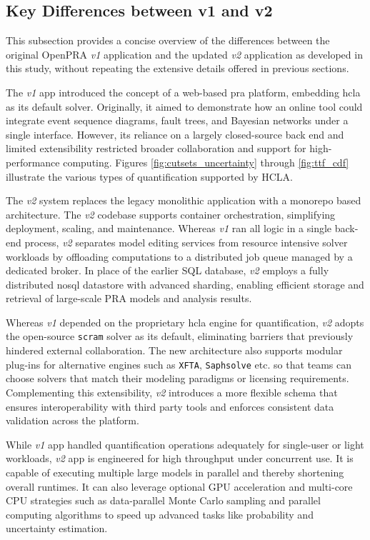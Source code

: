 \subsection{Key Differences between v1 and v2}
\label{sec:distinguish-v1-v2}
This subsection provides a concise overview of the differences between the original OpenPRA \textit{v1} application and the updated \textit{v2} application as developed in this study, without repeating the extensive details offered in previous sections.

The \textit{v1} app introduced the concept of a web-based \acrshort{pra} platform, embedding \acrshort{hcla} \cite{hcla_cmd} as its default solver. Originally, it aimed to demonstrate how an online tool could integrate event sequence diagrams, fault trees, and Bayesian networks under a single interface. However, its reliance on a largely closed-source back end and limited extensibility restricted broader collaboration and support for high-performance computing. Figures \ref{fig:cutsets_uncertainty} through \ref{fig:ttf_cdf} illustrate the various types of quantification supported by HCLA.

The \textit{v2} system replaces the legacy monolithic application with a monorepo based architecture. The \textit{v2} codebase supports container orchestration, simplifying deployment, scaling, and maintenance. Whereas \textit{v1} ran all logic in a single back-end process, \textit{v2} separates model editing services from resource intensive solver workloads by offloading computations to a distributed job queue managed by a dedicated broker. In place of the earlier SQL database, \textit{v2} employs a fully distributed \acrfull{nosql} datastore with advanced sharding, enabling efficient storage and retrieval of large-scale PRA models and analysis results.

Whereas \textit{v1} depended on the proprietary \acrshort{hcla} engine for quantification, \textit{v2} adopts the open-source \texttt{scram} solver as its default, eliminating barriers that previously hindered external collaboration. The new architecture also supports modular plug-ins for alternative engines such as \texttt{XFTA}, \texttt{Saphsolve} etc. so that teams can choose solvers that match their modeling paradigms or licensing requirements. Complementing this extensibility, \textit{v2} introduces a more flexible schema that ensures interoperability with third party tools and enforces consistent data validation across the platform.

While \textit{v1} app handled quantification operations adequately for single-user or light workloads, \textit{v2} app is engineered for high throughput under concurrent use. It is capable of executing multiple large models in parallel and thereby shortening overall runtimes. It can also leverage optional GPU acceleration and multi-core CPU strategies such as data-parallel Monte Carlo sampling and parallel computing algorithms to speed up advanced tasks like probability and uncertainty estimation.

